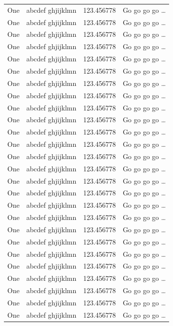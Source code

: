 \documentclass[phd]{ndsu-thesis-2022}
\begin{document}
\begin{longtable}{l l l l}
One & abcdef ghjijklmn & 123.456778  & Go go go go \ldots \\
One & abcdef ghjijklmn & 123.456778  & Go go go go \ldots \\
One & abcdef ghjijklmn & 123.456778  & Go go go go \ldots \\
One & abcdef ghjijklmn & 123.456778  & Go go go go \ldots \\
One & abcdef ghjijklmn & 123.456778  & Go go go go \ldots \\
One & abcdef ghjijklmn & 123.456778  & Go go go go \ldots \\
One & abcdef ghjijklmn & 123.456778  & Go go go go \ldots \\
One & abcdef ghjijklmn & 123.456778  & Go go go go \ldots \\
One & abcdef ghjijklmn & 123.456778  & Go go go go \ldots \\
One & abcdef ghjijklmn & 123.456778  & Go go go go \ldots \\
One & abcdef ghjijklmn & 123.456778  & Go go go go \ldots \\
One & abcdef ghjijklmn & 123.456778  & Go go go go \ldots \\
One & abcdef ghjijklmn & 123.456778  & Go go go go \ldots \\
One & abcdef ghjijklmn & 123.456778  & Go go go go \ldots \\
One & abcdef ghjijklmn & 123.456778  & Go go go go \ldots \\
One & abcdef ghjijklmn & 123.456778  & Go go go go \ldots \\
One & abcdef ghjijklmn & 123.456778  & Go go go go \ldots \\
One & abcdef ghjijklmn & 123.456778  & Go go go go \ldots \\
One & abcdef ghjijklmn & 123.456778  & Go go go go \ldots \\
One & abcdef ghjijklmn & 123.456778  & Go go go go \ldots \\
One & abcdef ghjijklmn & 123.456778  & Go go go go \ldots \\
One & abcdef ghjijklmn & 123.456778  & Go go go go \ldots \\
One & abcdef ghjijklmn & 123.456778  & Go go go go \ldots \\
One & abcdef ghjijklmn & 123.456778  & Go go go go \ldots \\
One & abcdef ghjijklmn & 123.456778  & Go go go go \ldots \\
One & abcdef ghjijklmn & 123.456778  & Go go go go \ldots \\

\end{longtable}
\end{document}
